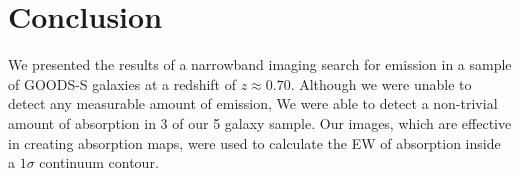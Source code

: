 \documentclass[twocolumn]{aastex6}
\begin{document}
\section{Conclusion}
We presented the results of a narrowband imaging search for  emission in a sample of GOODS-S galaxies at a redshift of $z \approx 0.70$. Although we were unable to detect any measurable amount of  emission, We were able to detect a non-trivial amount of  absorption in 3 of our 5 galaxy sample. Our images, which are effective in creating absorption maps, were used to calculate the EW of absorption inside a $1\sigma$ continuum contour. 

\end{document}
